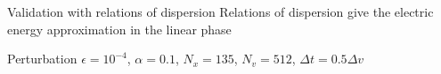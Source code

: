 \documentclass{beamer}
\begin{document}
\begin{frame}{Validation with relations of dispersion}
  Relations of dispersion give the electric energy approximation in the linear phase

  Perturbation $\epsilon=10^{-4}$, $\alpha=0.1$, $N_x = 135$, $N_v = 512$, $\Delta t = 0.5\Delta v$
\end{frame}
\end{document}
